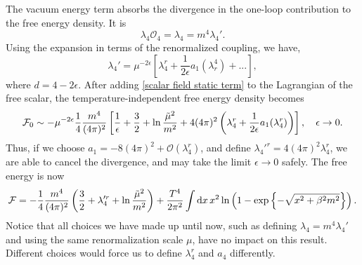 The vacuum energy term absorbs the divergence in the one-loop contribution to the free energy density.
It is
%
\begin{equation}
    \label{scalar field static term}
    \lambda_4 \mathcal{O}_4 = \lambda_4 = m^4 \lambda_4'.
\end{equation}
%
Using the expansion in terms of the renormalized coupling, we have, 
%
\begin{equation}
    \lambda_4' = \mu^{- 2 \epsilon}\left[ \lambda_4^r + \frac{1}{2 \epsilon} a_1(\lambda_r^4) + ... \right],
\end{equation}
%
where $d = 4 - 2\epsilon$.
After adding \autoref{scalar field static term} to the Lagrangian of the free scalar, the temperature-independent free energy density becomes
%
\begin{equation}
    \mathcal{F}_0 \sim - \mu^{-2 \epsilon}  \frac{1}{4} \frac{m^4}{(4 \pi)^2}  
    \left[
        \frac{1}{\epsilon} + \frac{3}{2} + \ln{\frac{\tilde \mu^2}{m^2}}
        + 4 (4 \pi)^2 \left(\lambda_4^r + \frac{1}{2\epsilon} a_1(\lambda_4^r)\right)
    \right],
    \quad \epsilon \rightarrow 0.
\end{equation}
%
Thus, if we choose $a_1 = -8 (4\pi)^2 + \mathcal{O}(\lambda_4^r)$, and define $\lambda_4'^r = 4(4\pi)^2\lambda_4^r$, we are able to cancel the divergence, and may take the limit $\epsilon \rightarrow 0$ safely.
The free energy is now
%
\begin{equation}
    \mathcal{F} = -\frac{1}{4} \frac{m^4}{(4 \pi)^2} 
    \left(
        \frac{3}{2} + \lambda_4'^r + \ln \frac{\tilde \mu^2}{m^2}
    \right)
    +
    \frac{T^4}{2\pi^2} \int \text{d} x \, x^2 \ln\left(1 - \text{exp} \left\{ -\sqrt{x^2 + \beta^2 m^2} \right\}\right).
\end{equation}
%
Notice that all choices we have made up until now, such as defining $\lambda_4 = m^4 \lambda_4'$ and using the same renormalization scale $\mu$, have no impact on this result.
Different choices would force us to define $\lambda_4^r$ and $a_4$ differently.

